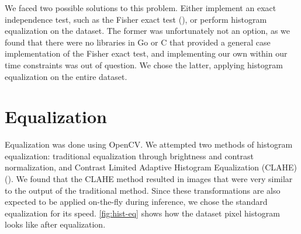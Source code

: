We faced two possible solutions to this problem. Either implement an exact independence test, such
as the Fisher exact test (\cite{fisher-exact}), or perform histogram equalization on the dataset.
The former was unfortunately not an option, as we found that there were no libraries in Go or C
that provided a general case implementation of the Fisher exact test, and implementing our own
within our time constraints was out of question. We chose the latter, applying histogram
equalization on the entire dataset.

\section{Equalization}

Equalization was done using OpenCV. We attempted two methods of histogram equalization: traditional
equalization through brightness and contrast normalization, and Contrast Limited Adaptive Histogram
Equalization (CLAHE) (\cite{clahe}). We found that the CLAHE method resulted in images that were
very similar to the output of the traditional method. Since these transformations are also expected
to be applied on-the-fly during inference, we chose the standard equalization for its speed.
\autoref{fig:hist-eq} shows how the dataset pixel histogram looks like after equalization.

